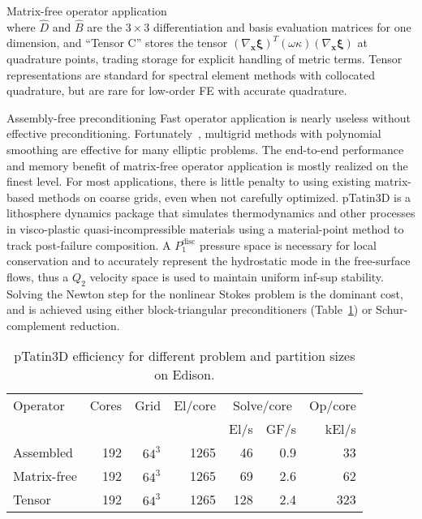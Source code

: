 \documentclass[final,t]{beamer}
\begin{document}
\begin{frame}{}
\begin{columns}
\begin{column}{0.48\textwidth}
\begin{block}{Matrix-free operator application}
\begin{equation}
        \end{equation}
        where $\hat D$ and $\hat B$ are the $3\times 3$ differentiation and basis evaluation matrices for one dimension,
        and ``Tensor C'' stores the tensor $(\nabla_{\mathbf x}\mathbf\xi)^T (\omega \kappa) (\nabla_{\mathbf x}\mathbf\xi)$ at quadrature points, trading storage for explicit handling of metric terms.
        Tensor representations are standard for spectral element methods with collocated quadrature, but are rare for low-order FE with accurate quadrature.
      \end{block}
      \vspace{-2em}
      \begin{block}{Assembly-free preconditioning}
        Fast operator application is nearly useless without effective preconditioning.
        Fortunately~\cite{Adams-02}, multigrid methods with polynomial smoothing are effective for many elliptic problems.
        The end-to-end performance and memory benefit of matrix-free operator application is mostly realized on the finest level.
        For most applications, there is little penalty to using existing matrix-based methods on coarse grids, even when not carefully optimized.
        pTatin3D is a lithosphere dynamics package that simulates thermodynamics and other processes in visco-plastic quasi-incompressible materials using a material-point method to track post-failure composition.
        A $P_1^{\text{disc}}$ pressure space is necessary for local conservation and to accurately represent the hydrostatic mode in the free-surface flows, thus a $Q_2$ velocity space is used to maintain uniform inf-sup stability.
        Solving the Newton step for the nonlinear Stokes problem is the dominant cost, and is achieved using either block-triangular preconditioners (Table~\ref{tab:scalability}) or Schur-complement reduction.
        \begin{table}
          \centering\caption{pTatin3D efficiency for different problem and partition sizes on Edison.}\label{tab:scalability}
          \begin{tabular}{l rrr rr r}
            \toprule
            Operator    & Cores & Grid   & El/core & \multicolumn{2}{c}{Solve/core} & Op/core           \\
            &       &        &         & El/s                    & GF/s & kEl/s \\
            \midrule
            Assembled   & 192 & $64^3$ & 1265 & 46  & 0.9 & 33         \\
            Matrix-free & 192 & $64^3$ & 1265 & 69  & 2.6 & 62         \\
            Tensor      & 192 & $64^3$ & 1265 & 128 & 2.4 & 323        \\
            

\end{tabular}
\end{table}
\end{block}
\end{column}
\end{columns}
\end{frame}
\end{document}
